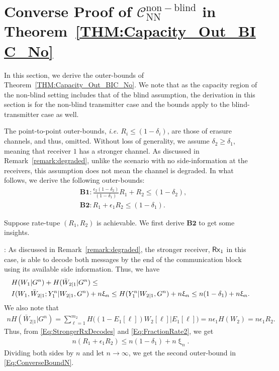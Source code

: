 \documentclass[journal,12pt,draftcls,onecolumn]{IEEEtran}
\newcommand{\lp}{\left(}
\newcommand{\rp}{\right)}
\begin{document}
\section{Converse Proof of $\mathcal{C}^\mathrm{non-blind}_\mathrm{NN}$ in Theorem~\ref{THM:Capacity_Out_BIC_No}}
\label{Section:Converse_BIC}

In this section, we derive the outer-bounds of Theorem~\ref{THM:Capacity_Out_BIC_No}. We note that as the capacity region of the non-blind setting includes that of the blind assumption, the derivation in this section is for the non-blind transmitter case and the bounds apply to the blind-transmitter case as well.

The point-to-point outer-bounds, \emph{i.e.} $R_i \leq (1-\delta_i)$, are those of erasure channels, and thus, omitted. Without loss of generality, we assume $\delta_2 \geq \delta_1$, meaning that receiver $1$ has a stronger channel. As discussed in Remark~\ref{remark:degraded}, unlike the scenario with no side-information at the receivers, this assumption does not mean the channel is degraded. In what follows, we derive the following outer-bounds:
\begin{align}
\label{Eq:ConverseBoundN}
& \mathbf{B1}: \frac{\epsilon_2(1-\delta_2)}{(1-\delta_1)} R_1 + R_{2} \leq \left( 1 - \delta_2 \right), \nonumber \\
& \mathbf{B2}: R_1 + \epsilon_1 R_2 \leq \left(1-\delta_1 \right).
\end{align}

Suppose rate-tupe $\lp R_1, R_2 \rp$ is achievable. We first derive $\mathbf{B2}$ to get some insights.

: As discussed in Remark~\ref{remark:degraded}, the stronger receiver, ${\sf Rx}_1$ in this case, is able to decode both messages by the end of the communication block using its available side information. Thus, we have
\begin{align}
\label{Eq:StrongerRxDecodes}
&H(W_1|G^n) + H(\bar{W}_{2|1}|G^n) \leq \notag \\ &I(W_1, \bar{W}_{2|1} ;Y_1^n|W_{2|1},G^n) + n \upxi_n \leq H(Y_1^n|W_{2|1},G^n) + n \upxi_n \leq n (1-\delta_1) + n \upxi_n.
\end{align}
We also note that
\begin{align}
\label{Eq:FractionRate2}
n H(\bar{W}_{2|1}|G^n)= \sum^{m_2}_{\ell=1} H\big((1-E_1[\ell])W_2[\ell]\big|E_1[\ell]\big)=n \epsilon_1 H(W_2)=n \epsilon_1 R_2.
\end{align}
Thus, from \eqref{Eq:StrongerRxDecodes} and \eqref{Eq:FractionRate2}, we get
\begin{align}
n (R_1 + \epsilon_1 R_2) \leq n (1-\delta_1) + n \upxi_n.
\end{align}
Dividing both sides by $n$ and let $n \rightarrow \infty$, we get the second outer-bound in \eqref{Eq:ConverseBoundN}.
\end{document}
